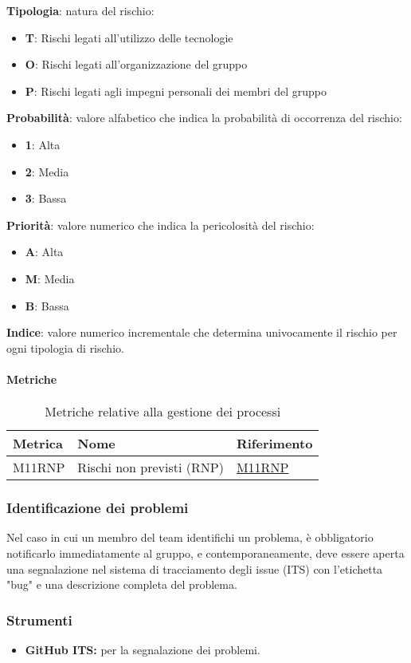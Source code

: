\begin{flushleft}
    \textbf{Tipologia}: natura del rischio:
    \begin{itemize}
        \item \textbf{T}: Rischi legati all'utilizzo delle tecnologie
        \item \textbf{O}: Rischi legati all'organizzazione del gruppo
        \item \textbf{P}: Rischi legati agli impegni personali dei membri del gruppo
    \end{itemize}
    \textbf{Probabilità}: valore alfabetico che indica la probabilità di occorrenza del rischio:
    \begin{itemize}
        \item \textbf{1}: Alta
        \item \textbf{2}: Media
        \item \textbf{3}: Bassa
    \end{itemize}
    \textbf{Priorità}: valore numerico che indica la pericolosità del rischio:
    \begin{itemize}
        \item \textbf{A}: Alta
        \item \textbf{M}: Media
        \item \textbf{B}: Bassa
    \end{itemize}
    \textbf{Indice}: valore numerico incrementale che determina univocamente il rischio per ogni tipologia di rischio. 
\end{flushleft}

\paragraph{Metriche}
\begin{table}[H]
  \centering
  \begin{tabular}{|C{3cm}|C{3cm}|C{4cm}|}
  \hline
  Metrica & Nome & Riferimento \\
  \hline \hline
  M11RNP & Rischi non previsti (RNP) &  \hyperlink{item:M11RNP}{\textcolor{linkcolor}{M11RNP}}\\ 
  \hline
  \end{tabular}
  \caption{Metriche relative alla gestione dei processi}
\end{table}

\subsubsection{Identificazione dei problemi}
Nel caso in cui un membro del team identifichi un problema, è obbligatorio notificarlo immediatamente al gruppo, e contemporaneamente, deve essere aperta una segnalazione nel sistema di tracciamento degli issue (ITS) con l'etichetta "bug" e una descrizione completa del problema.

\subsubsection{Strumenti}
\begin{itemize}
    \item \textbf{GitHub ITS:} 
        per la segnalazione dei problemi.
\end{itemize}